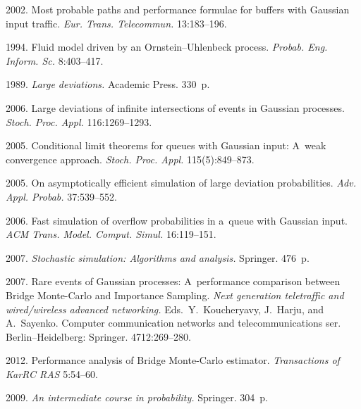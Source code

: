 \begin{multicols}{2}
{{\begin{thebibliography}{99}
 2002.
Most probable paths and performance formulae 
for buffers with Gaussian input traffic. \textit{Eur. Trans. 
Telecommun.} 13:183--196.


 1994. Fluid model driven by an Ornstein--Uhlenbeck 
process. \textit{Probab. Eng. Inform. Sc.} 8:403--417.

 1989. \textit{Large deviations.}  
Academic Press. 330~p.

 2006.  
Large deviations of infinite intersections of events in Gaussian processes. 
\textit{Stoch. Proc. Appl.} 116:1269--1293.

 2005. Conditional limit theorems for queues with Gaussian input: 
A~weak convergence approach. \textit{Stoch. Proc. Appl.} 
115(5):849--873.

 2005.
On asymptotically efficient simulation of large deviation probabilities. 
\textit{Adv. Appl. Probab.} 37:539--552.

 2006.
Fast simulation of overflow probabilities in a~queue with Gaussian input. 
\textit{ACM Trans. Model. Comput. Simul.} 16:119--151.

 2007. 
\textit{Stochastic simulation: Algorithms and analysis.} Springer. 476~p.

 2007. Rare events of Gaussian 
processes: A~performance comparison between Bridge Monte-Carlo and Importance 
Sampling. \textit{Next generation teletraffic and wired/wireless advanced networking.}
Eds.\ Y.~Koucheryavy, J.~Harju, and A.~Sayenko.
Computer communication networks and
telecommunications ser. Berlin--Heidelberg: Springer. 
4712:269--280.

 2012. 
Performance analysis of Bridge Monte-Carlo estimator. 
\textit{Transactions of KarRC RAS} 5:54--60.

 2009. \textit{An intermediate course in probability.} Springer. 304~p.

\end{thebibliography} } }

\end{multicols}

